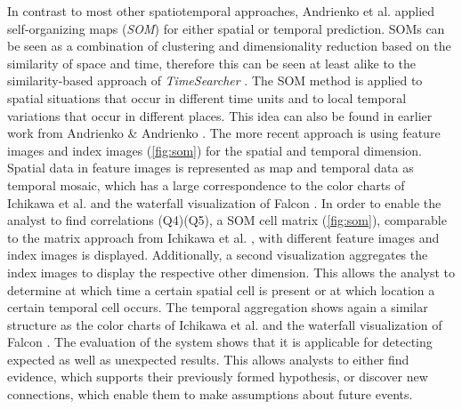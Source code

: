 \documentclass[electronic]{vgtc}             %
\begin{document}
In contrast to most other spatiotemporal approaches, Andrienko et al. \cite{Andrienko:2010:Space} applied self-organizing maps (\textit{SOM}) for either spatial or temporal prediction.
SOMs can be seen as a combination of clustering and dimensionality reduction based on the similarity of space and time, therefore this can be seen at least alike to the similarity-based approach of \textit{TimeSearcher} \cite{buono:2007}.
The SOM method is applied to spatial situations that occur in different time units and to local temporal variations that occur in different places.
This idea can also be found in earlier work from Andrienko \& Andrienko \cite{Andrienko:2005}.
The more recent approach is using feature images and index images (\autoref{fig:som}) for the spatial and temporal dimension.
Spatial data in feature images is represented as map and temporal data as temporal mosaic, which has a large correspondence to the color charts of Ichikawa et al. \cite{ichikawa:2002} and the waterfall visualization of Falcon \cite{steed:2017}.
In order to enable the analyst to find correlations (Q4)(Q5), a SOM cell matrix (\autoref{fig:som}), comparable to the matrix approach from Ichikawa et al. \cite{ichikawa:2002}, with different feature images and index images is displayed.
Additionally, a second visualization aggregates the index images to display the respective other dimension.
This allows the analyst to determine at which time a certain spatial cell is present or at which location a certain temporal cell occurs.
The temporal aggregation shows again a similar structure as the color charts of Ichikawa et al. \cite{ichikawa:2002} and the waterfall visualization of Falcon \cite{steed:2017}.
The evaluation of the system shows that it is applicable for detecting expected as well as unexpected results.
This allows analysts to either find evidence, which supports their previously formed hypothesis, or discover new connections, which enable them to make assumptions about future events. 
\end{document}
